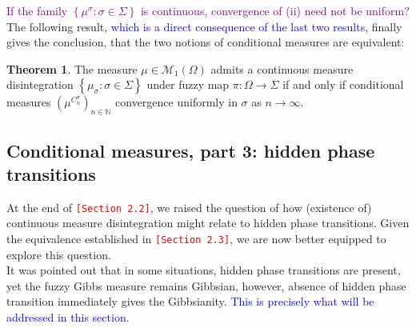\documentclass[12pt]{article}
\newcommand{\M}{\mathcal{M}}
\newcommand{\N}{\mathbb{N}}
\newcommand{\set}[1]{\left\{#1\right\}}
\newcommand{\ra}{\rightarrow}
\newcommand{\1}{\mathbbm{1}}
\newcommand{\5}{\vspace{0.5cm}}
\theoremstyle{definition}
\newtheorem{thm}{Theorem}[section]
\begin{document}
\textcolor{purple}{If the family $\set{\mu^\sigma:\sigma\in\Sigma}$ is continuous, convergence of (ii) need not be uniform?} \\

The following result, \textcolor{blue}{which is a direct consequence of the last two results,} finally gives the conclusion, that the two notions of conditional measures are equivalent:
\begin{thm}
The measure $\mu\in\M_1(\Omega)$ admits a continuous measure disintegration $\set{\mu_\sigma:\sigma\in\Sigma}$ under fuzzy map $\pi:\Omega\ra\Sigma$ if and only if conditional measures $(\mu^{C_n^\sigma})_{n\in\N}$ convergence uniformly in $\sigma$ as $n\ra\infty$.
\end{thm}


\subsection{Conditional measures, part 3: hidden phase transitions}

At the end of \textcolor{red}{\texttt{[Section 2.2]}}, we raised the question of how (existence of) continuous measure disintegration might relate to hidden phase transitions. Given the equivalence established in \textcolor{red}{\texttt{[Section 2.3]}}, we are now better equipped to explore this question. \\

It was pointed out that in some situations, hidden phase transitions are present, yet the fuzzy Gibbs measure remains Gibbsian, however, absence of hidden phase transition immediately gives the Gibbsianity. \textcolor{blue}{This is precisely what will be addressed in this section.} \\
\end{document}
